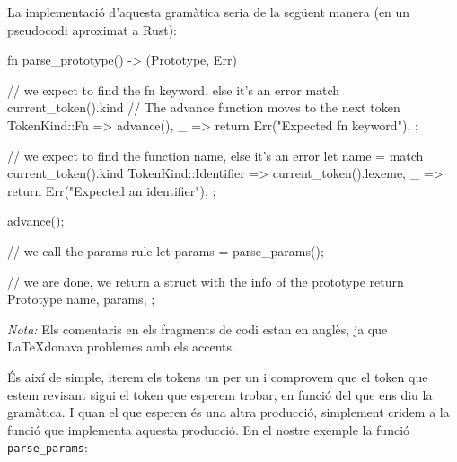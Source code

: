 ﻿\documentclass{article}
\begin{document}
La implementació d'aquesta gramàtica seria de la següent manera (en un
pseudocodi aproximat a Rust):

\begin{code}
fn parse_prototype() -> (Prototype, Err) {
    // we expect to find the fn keyword, else it's an error
    match current_token().kind {
        // The advance function moves to the next token
        TokenKind::Fn => advance(),
        _ => return Err("Expected fn keyword"),
    };

    // we expect to find the function name, else it's an error
    let name = match current_token().kind {
        TokenKind::Identifier => current_token().lexeme,
        _ => return Err("Expected an identifier"),
    };

    advance();

    // we call the params rule
    let params = parse_params();

    // we are done, we return a struct with the info of the prototype
    return Prototype { 
        name,
        params,
    };
}
\end{code}

\textit{Nota:} Els comentaris en els fragments de codi estan en anglès, ja que
\LaTeX donava problemes amb els accents.

És així de simple, iterem els tokens un per un i comprovem que el token que
estem revisant sigui el token que esperem trobar, en funció del que ens diu la
gramàtica. I quan el que esperen és una altra producció, simplement cridem a la
funció que implementa aquesta producció. En el nostre exemple la funció
\texttt{parse\_params}:
\end{document}
